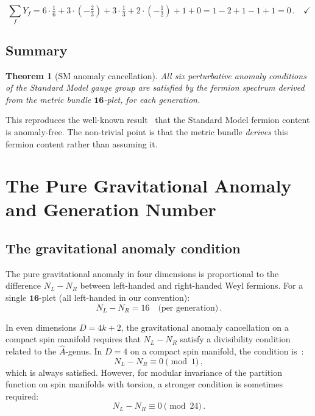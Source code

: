 \documentclass[12pt,a4paper]{article}
\newtheorem{theorem}{Theorem}[section]
\theoremstyle{definition}
\begin{document}
\begin{equation}
\sum_f Y_f = 6 \cdot \tfrac{1}{6} + 3 \cdot (-\tfrac{2}{3}) + 3 \cdot \tfrac{1}{3} + 2 \cdot (-\tfrac{1}{2}) + 1 + 0 = 1 - 2 + 1 - 1 + 1 = 0\,. \quad\checkmark
\end{equation}

\subsection{Summary}

\begin{theorem}[SM anomaly cancellation]
\label{thm:SM_anomaly_free}
All six perturbative anomaly conditions of the Standard Model gauge group are satisfied by the fermion spectrum derived from the metric bundle $\mathbf{16}$-plet, for each generation.
\end{theorem}

This reproduces the well-known result~\cite{BouchiatIliopoulosMeyer1972} that the Standard Model fermion content is anomaly-free.
The non-trivial point is that the metric bundle \emph{derives} this fermion content rather than assuming it.


\section{The Pure Gravitational Anomaly and Generation Number}
\label{sec:gravitational}

\subsection{The gravitational anomaly condition}

The pure gravitational anomaly in four dimensions is proportional to the difference $N_L - N_R$ between left-handed and right-handed Weyl fermions.
For a single $\mathbf{16}$-plet (all left-handed in our convention):
\begin{equation}
N_L - N_R = 16 \quad\text{(per generation)}\,.
\end{equation}

In even dimensions $D = 4k + 2$, the gravitational anomaly cancellation on a compact spin manifold requires that $N_L - N_R$ satisfy a divisibility condition related to the $\hat{A}$-genus.
In $D = 4$ on a compact spin manifold, the condition is~\cite{AlvarezGaume1984}:
\begin{equation}
N_L - N_R \equiv 0 \pmod{1}\,,
\end{equation}
which is always satisfied.
However, for modular invariance of the partition function on spin manifolds with torsion, a stronger condition is sometimes required:
\begin{equation}
N_L - N_R \equiv 0 \pmod{24}\,.
\end{equation}
\end{document}
